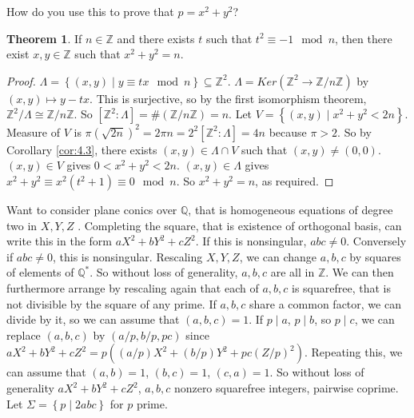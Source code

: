 \documentclass{article}
\newcommand{\Z}{\mathbb{Z}}
\newcommand{\Q}{\mathbb{Q}}
\newcommand{\rb}[1]{\left( #1 \right)}
\renewcommand{\sb}[1]{\left[ #1 \right]}
\newcommand{\cb}[1]{\left\{ #1 \right\}}
\theoremstyle{definition}\newtheorem{definition}{Definition}[section]
\theoremstyle{definition}\newtheorem{remark}[definition]{Remark}
\theoremstyle{definition}\newtheorem*{example}{Example}
\theoremstyle{definition}\newtheorem*{note}{Note}
\newtheorem{theorem}[definition]{Theorem}
\begin{document}
How do you use this to prove that $ p = x^2 + y^2 $?


\begin{theorem}
If $ n \in \Z $ and there exists $ t $ such that $ t^2 \equiv -1 \mod n $, then there exist $ x, y \in \Z $ such that $ x^2 + y^2 = n $.
\end{theorem}

\begin{proof}
$ \Lambda = \cb{\rb{x, y} \mid y \equiv tx \mod n} \subseteq \Z^2 $. $ \Lambda = Ker\rb{\Z^2 \to \Z / n\Z} $ by $ \rb{x, y} \mapsto y - tx $. This is surjective, so by the first isomorphism theorem, $ \Z^2 / \Lambda \cong \Z / n\Z $. So $ \sb{\Z^2 : \Lambda} = \#\rb{\Z / n\Z} = n $. Let $ V = \cb{\rb{x, y} \mid x^2 + y^2 < 2n} $. Measure of $ V $ is $ \pi\rb{\sqrt{2n}}^2 = 2\pi n = 2^2\sb{\Z^2 : \Lambda} = 4n $ because $ \pi > 2 $. So by Corollary \ref{cor:4.3}, there exists $ \rb{x, y} \in \Lambda \cap V $ such that $ \rb{x, y} \ne \rb{0, 0} $. $ \rb{x, y} \in V $ gives $ 0 < x^2 + y^2 < 2n $. $ \rb{x, y} \in \Lambda $ gives $ x^2 + y^2 \equiv x^2\rb{t^2 + 1} \equiv 0 \mod n $. So $ x^2 + y^2 = n $, as required.
\end{proof}

Want to consider plane conics over $ \Q $, that is homogeneous equations of degree two in $ X, Y, Z $ . Completing the square, that is existence of orthogonal basis, can write this in the form $ aX^2 + bY^2 + cZ^2 $. If this is nonsingular, $ abc \ne 0 $. Conversely if $ abc \ne 0 $, this is nonsingular. Rescaling $ X, Y, Z $, we can change $ a, b, c $ by squares of elements of $ \Q^* $. So without loss of generality, $ a, b, c $ are all in $ \Z $. We can then furthermore arrange by rescaling again that each of $ a, b, c $ is squarefree, that is not divisible by the square of any prime. If $ a, b, c $ share a common factor, we can divide by it, so we can assume that $ \rb{a, b, c} = 1 $. If $ p \mid a $, $ p \mid b $, so $ p \mid c $, we can replace $ \rb{a, b, c} $ by $ \rb{a / p, b / p, pc} $ since $ aX^2 + bY^2 + cZ^2 = p\rb{\rb{a / p}X^2 + \rb{b / p}Y^2 + pc\rb{Z / p}^2} $. Repeating this, we can assume that $ \rb{a, b} = 1 $, $ \rb{b, c} = 1 $, $ \rb{c, a} = 1 $. So without loss of generality $ aX^2 + bY^2 + cZ^2 $, $ a, b, c $ nonzero squarefree integers, pairwise coprime. Let $ \Sigma = \cb{p \mid 2abc} $ for $ p $ prime.
\end{document}
